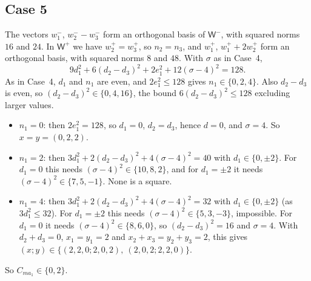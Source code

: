 \documentclass[11pt,a4paper]{amsart}
\theoremstyle{definition}
\theoremstyle{remark}
\newcommand{\Wm}{\mathsf{W}^{-}}
\newcommand{\Wp}{\mathsf{W}^{+}}
\begin{document}
\subsection*{Case 5}
The vectors $w_1^-$, $w_2^--w_3^-$ form an orthogonal basis of $\Wm$, with squared norms $16$ and $24$. In $\Wp$
we have $w_2^+=w_3^+$, so $n_2=n_3$, and $w_1^+$, $w_1^++2w_2^+$ form an orthogonal basis, with squared norms
$8$ and $48$. With $\sigma$ as in Case~4,
\[
9d_1^2+6(d_2-d_3)^2+2e_1^2+12(\sigma-4)^2=128 .
\]
As in Case~4, $d_1$ and $n_1$ are even, and $2e_1^2\le128$ gives $n_1\in\{0,2,4\}$. Also $d_2-d_3$ is even, so
$(d_2-d_3)^2\in\{0,4,16\}$, the bound $6(d_2-d_3)^2\le128$ excluding larger values.
\begin{itemize}[leftmargin=2em]
\item $n_1=0$: then $2e_1^2=128$, so $d_1=0$, $d_2=d_3$, hence $d=0$, and $\sigma=4$. So $x=y=(0,2,2)$.
\item $n_1=2$: then $3d_1^2+2(d_2-d_3)^2+4(\sigma-4)^2=40$ with $d_1\in\{0,\pm2\}$. For $d_1=0$ this needs
$(\sigma-4)^2\in\{10,8,2\}$, and for $d_1=\pm2$ it needs $(\sigma-4)^2\in\{7,5,-1\}$. None is a square.
\item $n_1=4$: then $3d_1^2+2(d_2-d_3)^2+4(\sigma-4)^2=32$ with $d_1\in\{0,\pm2\}$ (as $3d_1^2\le32$). For
$d_1=\pm2$ this needs $(\sigma-4)^2\in\{5,3,-3\}$, impossible. For $d_1=0$ it needs
$(\sigma-4)^2\in\{8,6,0\}$, so $(d_2-d_3)^2=16$ and $\sigma=4$. With $d_2+d_3=0$, $x_1=y_1=2$ and
$x_2+x_3=y_2+y_3=2$, this gives $(x;y)\in\{(2,2,0;2,0,2),\ (2,0,2;2,2,0)\}$.
\end{itemize}
So $C_{ma_1}\in\{0,2\}$.
\end{document}
